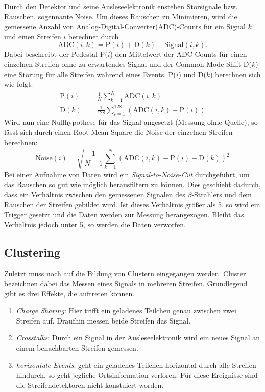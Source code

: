 Durch den Detektor und seine Ausleseelektronik enstehen Störsignale bzw. Rauschen,
sogennante Noise. Um dieses Rauschen zu Minimieren, wird die gemessene Anzahl von
Analog-Digital-Converter(ADC)-Counts für ein Signal $k$ und einen Streifen $i$
berechnet durch
\begin{equation*}
  \text{ADC}(i, k) = \text{P}(i) + \text{D}(k) + \text{Signal}(i, k).
\end{equation*}
Dabei beschreibt der Pedestal P($i$) den Mittelwert der ADC-Counts für einen
einzelnen Streifen ohne zu erwartendes Signal und der Common Mode Shift D($k$)
eine Störung für alle Streifen während eines Events. P($i$) und D($k$) berechnen
sich wie folgt:
\begin{align}
  \text{P}(i) &= \frac{1}{N} \sum_{k=1}^N \text{ADC}(i, k)
  \label{eqn:pedestal} \\
  \text{D}(k) &= \frac{1}{128} \sum_{i=1}^{128} \left(\text{ADC}(i, k) - \text{P}(i) \right)
  \label{eqn:common-mode}
\end{align}
Wird nun eine Nullhypothese für das Signal angesetzt (Messung ohne Quelle),
so lässt sich durch einen Root Mean Square die Noise der einzelnen Streifen berechnen:
\begin{equation}
  \text{Noise}(i) = \sqrt{ \frac{1}{N-1} \sum_{k=1}^N \left(\text{ADC}(i,k) - \text{P} (i) - \text{D}(k)\right)^2 }
  \label{eqn:noise}
\end{equation}
Bei einer Aufnahme von Daten wird ein \textit{Signal-to-Noise-Cut} durchgeführt,
um das Rauschen so gut wie möglich herausfiltern zu können. Dies geschieht
dadurch, dass ein Verhältnis zwischen den gemessenen Signalen des $\beta$-Strahlers
und dem Rauschen der Streifen gebildet wird. Ist dieses Verhältnis größer als 5,
so wird ein Trigger gesetzt und die Daten werden zur Messung herangezogen. Bleibt
das Verhältnis jedoch unter 5, so werden die Daten verworfen.

\subsection{Clustering}
\label{sec:Clustering}
Zuletzt muss noch auf die Bildung von Clustern eingegangen werden. Cluster
bezeichnen dabei das Messen eines Signals in mehreren Streifen. Grundlegend
gibt es drei Effekte, die auftreten können.
\begin{enumerate}
  \item \textit{Charge Sharing}: Hier trifft ein geladenes Teilchen genau
  zwischen zwei Streifen auf. Draufhin messen beide Streifen das Signal.
  \item \textit{Crosstalks}: Durch ein Signal in der Ausleseelektronik wird ein
  neues Signal an einem benachbarten Streifen gemessen.
  \item \textit{horizontale Events}: geht ein geladenes Teilchen horizontal durch
  alle Streifen hindurch, so geht jegliche Ortsinformation verloren. Für diese
  Ereignisse sind die Streifendetektoren nicht konstuiert worden.
\end{enumerate}
